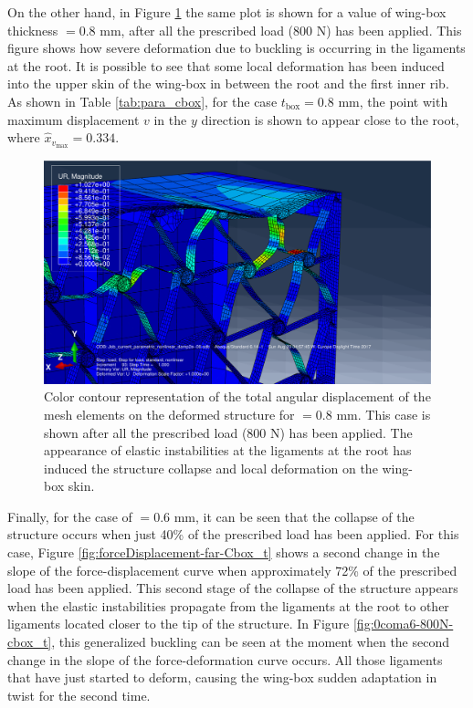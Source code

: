     On the other hand, in Figure \ref{fig:0coma8-800N-cbox_t} the same plot is shown for a value of wing-box thickness \boxt$= 0.8$ mm, after all the prescribed load (800 N) has been applied. This figure shows how severe deformation due to buckling is occurring in the ligaments at the root. It is possible to see that some local deformation has been induced into the upper skin of the wing-box in between the root and the first inner rib. As shown in Table \ref{tab:para_cbox}, for the case $t_{\mathrm{box}} = 0.8$ mm, the point with maximum displacement $v$ in the $y$ direction is shown to appear close to the root, where $\hat{x}_{v_{\mathrm{max}}} = 0.334$.

    \begin{figure}[!htpb] %
      \centering
      \includegraphics[width=0.8 \textwidth]{figures/result-sim/cbox/0coma8-800N-2}
      \caption[Color contour representation of the total angular displacement of the mesh elements on the deformed structure for \boxt$ = 0.8$ mm]{Color contour representation of the total angular displacement of the mesh elements on the deformed structure for \boxt$ = 0.8$ mm. This case is shown after all the prescribed load (800 N) has been applied. The appearance of elastic instabilities at the ligaments at the root has induced the structure collapse and local deformation on the wing-box skin.}\label{fig:0coma8-800N-cbox_t}
    \end{figure}

    Finally, for the case of \boxt$= 0.6$ mm, it can be seen that the collapse of the structure occurs when just 40\% of the prescribed load has been applied. For this case, Figure \ref{fig:forceDisplacement-far-Cbox_t} shows a second change in the slope of the force-displacement curve when approximately 72\% of the prescribed load has been applied. This second stage of the collapse of the structure appears when the elastic instabilities propagate from the ligaments at the root to other ligaments located closer to the tip of the structure. In Figure \ref{fig:0coma6-800N-cbox_t}, this generalized buckling can be seen at the moment when the second change in the slope of the force-deformation curve occurs. All those ligaments that have just started to deform, causing the wing-box sudden adaptation in twist for the second time. 

